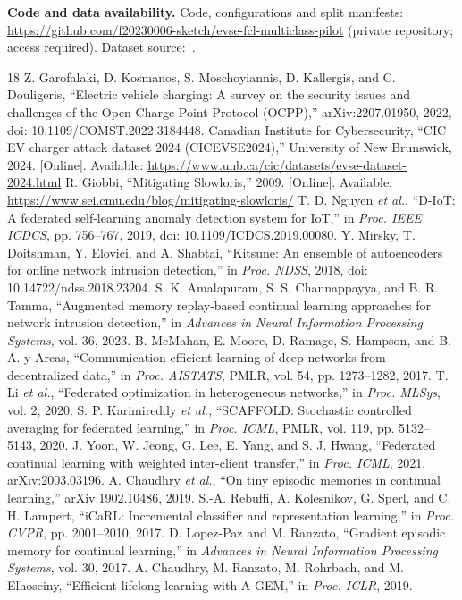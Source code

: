 \documentclass[journal,10pt]{IEEEtran}
\begin{document}
\noindent\textbf{Code and data availability.} Code, configurations and split manifests: \url{https://github.com/f20230006-sketch/evse-fcl-multiclass-pilot} (private repository; access required). Dataset source:~\cite{dataset}.

\begin{thebibliography}{18}
 Z. Garofalaki, D. Kosmanos, S. Moschoyiannis, D. Kallergis, and C. Douligeris, ``Electric vehicle charging: A survey on the security issues and challenges of the Open Charge Point Protocol (OCPP),'' arXiv:2207.01950, 2022, doi: 10.1109/COMST.2022.3184448.
 Canadian Institute for Cybersecurity, ``CIC EV charger attack dataset 2024 (CICEVSE2024),'' University of New Brunswick, 2024. [Online]. Available: \url{https://www.unb.ca/cic/datasets/evse-dataset-2024.html}
 R. Giobbi, ``Mitigating Slowloris,'' 2009. [Online]. Available: \url{https://www.sei.cmu.edu/blog/mitigating-slowloris/}
 T. D. Nguyen \emph{et al.}, ``D-IoT: A federated self-learning anomaly detection system for IoT,'' in \emph{Proc. IEEE ICDCS}, pp. 756--767, 2019, doi: 10.1109/ICDCS.2019.00080.
 Y. Mirsky, T. Doitshman, Y. Elovici, and A. Shabtai, ``Kitsune: An ensemble of autoencoders for online network intrusion detection,'' in \emph{Proc. NDSS}, 2018, doi: 10.14722/ndss.2018.23204.
 S. K. Amalapuram, S. S. Channappayya, and B. R. Tamma, ``Augmented memory replay-based continual learning approaches for network intrusion detection,'' in \emph{Advances in Neural Information Processing Systems}, vol. 36, 2023.
 B. McMahan, E. Moore, D. Ramage, S. Hampson, and B. A. y Arcas, ``Communication-efficient learning of deep networks from decentralized data,'' in \emph{Proc. AISTATS}, PMLR, vol. 54, pp. 1273--1282, 2017.
 T. Li \emph{et al.}, ``Federated optimization in heterogeneous networks,'' in \emph{Proc. MLSys}, vol. 2, 2020.
 S. P. Karimireddy \emph{et al.}, ``SCAFFOLD: Stochastic controlled averaging for federated learning,'' in \emph{Proc. ICML}, PMLR, vol. 119, pp. 5132--5143, 2020.
 J. Yoon, W. Jeong, G. Lee, E. Yang, and S. J. Hwang, ``Federated continual learning with weighted inter-client transfer,'' in \emph{Proc. ICML}, 2021, arXiv:2003.03196.
 A. Chaudhry \emph{et al.}, ``On tiny episodic memories in continual learning,'' arXiv:1902.10486, 2019.
 S.-A. Rebuffi, A. Kolesnikov, G. Sperl, and C. H. Lampert, ``iCaRL: Incremental classifier and representation learning,'' in \emph{Proc. CVPR}, pp. 2001--2010, 2017.
 D. Lopez-Paz and M. Ranzato, ``Gradient episodic memory for continual learning,'' in \emph{Advances in Neural Information Processing Systems}, vol. 30, 2017.
 A. Chaudhry, M. Ranzato, M. Rohrbach, and M. Elhoseiny, ``Efficient lifelong learning with A-GEM,'' in \emph{Proc. ICLR}, 2019.


\end{thebibliography}
\end{document}
